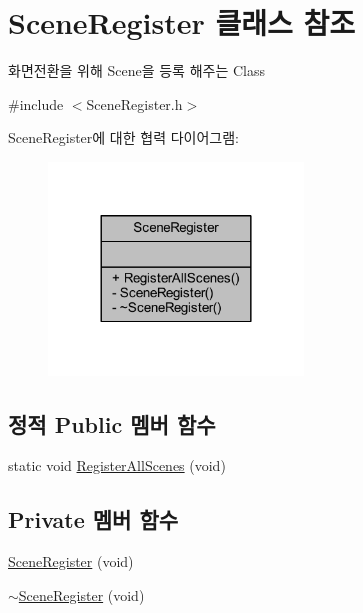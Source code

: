 \hypertarget{class_scene_register}{\section{Scene\+Register 클래스 참조}
\label{class_scene_register}
}


화면전환을 위해 Scene을 등록 해주는 Class  




{\ttfamily \#include $<$Scene\+Register.\+h$>$}



Scene\+Register에 대한 협력 다이어그램\+:
\nopagebreak
\begin{figure}[H]
\begin{center}
\leavevmode
\includegraphics[width=192pt]{class_scene_register__coll__graph}
\end{center}
\end{figure}
\subsection*{정적 Public 멤버 함수}
\begin{DoxyCompactItemize}
\item 
static void \hyperlink{class_scene_register_aec7affc4301e23183672e6e0196bdd91}{Register\+All\+Scenes} (void)
\end{DoxyCompactItemize}
\subsection*{Private 멤버 함수}
\begin{DoxyCompactItemize}
\item 
\hyperlink{class_scene_register_a6a98cda3bfc406c979248e6ecf133d7e}{Scene\+Register} (void)
\item 
\hyperlink{class_scene_register_a48844dea6f4081b36ec648368b8ec64c}{$\sim$\+Scene\+Register} (void)
\end{DoxyCompactItemize}


